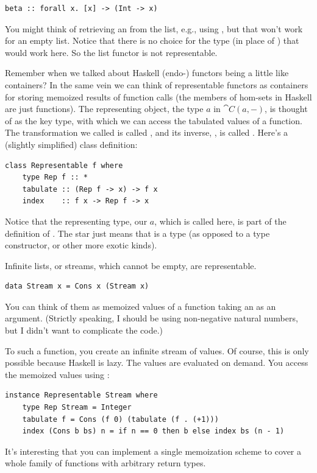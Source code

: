 \begin{Verbatim}
beta :: forall x. [x] -> (Int -> x)
\end{Verbatim}
You might think of retrieving an  from the list, e.g., using
, but that won't work for an empty list. Notice that there
is no choice for the type  (in place of ) that
would work here. So the list functor is not representable.

Remember when we talked about Haskell (endo-) functors being a little
like containers? In the same vein we can think of representable functors
as containers for storing memoized results of function calls (the
members of hom-sets in Haskell are just functions). The representing
object, the type $a$ in $\cat{C}(a, -)$, is thought of as the
key type, with which we can access the tabulated values of a function.
The transformation we called  is called , and its
inverse, , is called . Here's a (slightly simplified)
 class definition:

\begin{Verbatim}
class Representable f where
    type Rep f :: *
    tabulate :: (Rep f -> x) -> f x
    index    :: f x -> Rep f -> x
\end{Verbatim}
Notice that the representing type, our $a$, which is called
 here, is part of the definition of
. The star just means that  is a
type (as opposed to a type constructor, or other more exotic kinds).

Infinite lists, or streams, which cannot be empty, are representable.

\begin{Verbatim}
data Stream x = Cons x (Stream x)
\end{Verbatim}
You can think of them as memoized values of a function taking an
 as an argument. (Strictly speaking, I should be using
non-negative natural numbers, but I didn't want to complicate the code.)

To  such a function, you create an infinite stream of
values. Of course, this is only possible because Haskell is lazy. The
values are evaluated on demand. You access the memoized values using
:

\begin{Verbatim}
instance Representable Stream where
    type Rep Stream = Integer
    tabulate f = Cons (f 0) (tabulate (f . (+1)))
    index (Cons b bs) n = if n == 0 then b else index bs (n - 1)
\end{Verbatim}
It's interesting that you can implement a single memoization scheme to
cover a whole family of functions with arbitrary return types.

